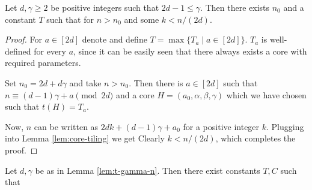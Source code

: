 \begin{lem}
\label{lem:t-gamma-n}

Let $d,\gamma \geq 2$ be positive integers such that $2d-1 \leq \gamma$. Then there exists $n_0$ and a constant $T$ such that
for $n > n_0$ and some $k < n/(2d)$.
\end{lem}
\begin{proof}
For $a \in [2d]$ denote
and define $T = \max \{T_a \mid a \in [2d]\}$. $T_a$ is well-defined for every $a$, since it can be easily seen that there always exists a core with required parameters.

Set $n_0 = 2d+d\gamma$ and take $n > n_0$. Then there is $a \in [2d]$ such that $n \equiv (d-1)\gamma + a \pmod{2d}$ and a core $H=(a_0,\alpha,\beta,\gamma)$ which we have chosen such that $t(H) = T_a$.

Now, $n$ can be written as $2dk + (d-1)\gamma + a_0$ for a positive integer $k$. Plugging into Lemma \ref{lem:core-tiling} we get
Clearly $k < n/(2d)$, which completes the proof.
\end{proof}

\begin{cor}
\label{cor:log-t-gamma-n}
Let $d,\gamma$ be as in Lemma \ref{lem:t-gamma-n}. Then there exist constants $T,C$ such that
\end{cor}%

